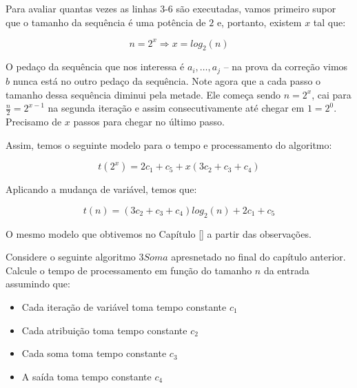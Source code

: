 Para avaliar quantas vezes as linhas 3-6 são executadas, vamos primeiro supor que o tamanho da sequência é uma potência de $2$ e, portanto, existem $x$ tal que:

\begin{displaymath}
  n = 2^x \Rightarrow x = log_2(n)
\end{displaymath}

O pedaço da sequência que nos interessa é $a_i, \dots, a_j$ -- na prova da correção vimos $b$ nunca está no outro pedaço da sequência.
Note agora que a cada passo o tamanho dessa sequência diminui pela metade.
Ele começa sendo $n = 2^x$, cai para $\frac{n}{2} = 2^{x-1}$ na segunda iteração e assim consecutivamente até chegar em $1 = 2^0$.
Precisamo de $x$ passos para chegar no último passo.

Assim, temos o seguinte modelo para o tempo e processamento do algoritmo:

\begin{displaymath}
  t(2^x) = 2c_1 + c_5 + x(3c_2 + c_3 + c_4)
\end{displaymath}

Aplicando a mudança de variável, temos que:

\begin{displaymath}
  t(n) = (3c_2 + c_3 + c_4)log_2(n) + 2c_1 + c_5
\end{displaymath}

O mesmo modelo que obtivemos no Capítulo \ref{} a partir das observações.

\begin{exercicio}
Considere o seguinte algoritmo $3Soma$ apresnetado no final do capítulo anterior.
Calcule o tempo de processamento em função do tamanho $n$ da entrada assumindo que:

\begin{itemize}
\item Cada iteração de variável toma tempo constante $c_1$
\item Cada atribuição toma tempo constante $c_2$
\item Cada soma toma tempo constante $c_3$
\item A saída toma tempo constante $c_4$
\end{itemize}
  
\end{exercicio}
